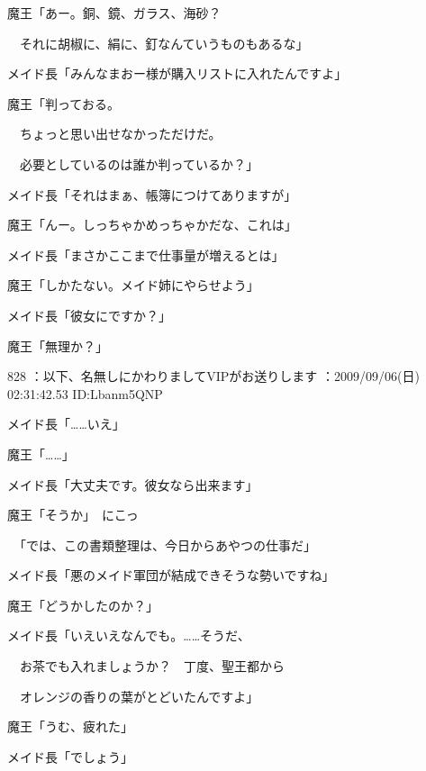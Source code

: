 \documentclass[a4j,twocolumn]{tarticle}
\begin{document}
魔王「あー。銅、鏡、ガラス、海砂？\par{} 
　それに胡椒に、絹に、釘なんていうものもあるな」 



メイド長「みんなまおー様が購入リストに入れたんですよ」 



魔王「判っておる。\par{} 
　ちょっと思い出せなかっただけだ。\par{} 
　必要としているのは誰か判っているか？」 



メイド長「それはまぁ、帳簿につけてありますが」 



魔王「んー。しっちゃかめっちゃかだな、これは」\par{} 
メイド長「まさかここまで仕事量が増えるとは」 



魔王「しかたない。メイド姉にやらせよう」\par{} 
メイド長「彼女にですか？」 



魔王「無理か？」 

	
    
    

828 ：以下、名無しにかわりましてVIPがお送りします ：2009/09/06(日) 02:31:42.53 ID:Lbanm5QNP 


メイド長「……いえ」\par{} 
魔王「……」 



メイド長「大丈夫です。彼女なら出来ます」 



魔王「そうか」　にこっ\par{} 
　「では、この書類整理は、今日からあやつの仕事だ」 



メイド長「悪のメイド軍団が結成できそうな勢いですね」 



魔王「どうかしたのか？」 



メイド長「いえいえなんでも。……そうだ、\par{} 
　お茶でも入れましょうか？　丁度、聖王都から\par{} 
　オレンジの香りの葉がとどいたんですよ」 



魔王「うむ、疲れた」\par{} 
メイド長「でしょう」 
\end{document}

